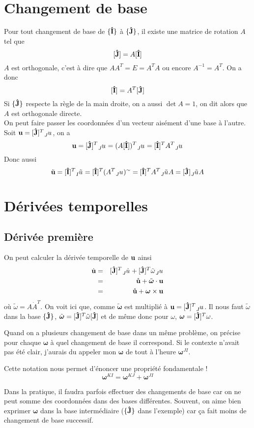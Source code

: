 \documentclass[11pt,a4paper]{article}
\newcommand\fv[1]{{\bf #1}} %
\newcommand\fvd[1]{\dot{\bf #1}} %
\newcommand\fvr[1]{\mathring{\bf #1}} %
\newcommand\ui{{\bf\hat{I}}} %
\newcommand\uj{{\bf\hat{J}}} %
\newcommand\wrt[2]{\ensuremath{\tensor*[_{ #1}]{ #2}{}}} %
\newcommand\omegaf{{\bm \omega}}
\newcommand\omegaft{\tilde{\bm \omega}}
\newcommand\omegat{\tilde{\omega}}
\begin{document}
\section{Changement de base}

Pour tout changement de base de $\{\ui\}$ à $\{\uj\}$, il existe une matrice de rotation $A$ tel que
\[ [\uj] = A [\ui] \]
$A$ est orthogonale, c'est à dire que $AA^T = E = A^TA$ ou encore $A^{-1} = A^T$.
On a donc
\[ [\ui] = A^T [\uj] \]
Si $\{\uj\}$ respecte la règle de la main droite, on a aussi $\det A = 1$, on dit alors que $A$ est orthogonale directe.\\
On peut faire passer les coordonnées d'un vecteur aisément d'une base à l'autre.
Soit $\fv{u} = [\uj]^T \wrt{J}{u}$, on a
\[ \fv{u} = [\uj]^T \wrt{J}{u} = (A[\ui])^T \wrt{J}{u} = [\ui]^TA^T \wrt{J}{u} \]
Donc aussi
\[ \tilde{\fv{u}} = [\ui]^T \wrt{I}{\tilde{u}} = [\ui]^T (A^T \wrt{J}{u})^{\sim} = [\ui]^T A^T \wrt{J}{\tilde{u}} A = [\uj] \wrt{J}{\tilde{u}} A \]

\section{Dérivées temporelles}

\subsection{Dérivée première}
On peut calculer la dérivée temporelle de $\fv{u}$ ainsi
\begin{eqnarray*}
	\fvd{u} &=& [\uj]^T \wrt{J}{\dot{u}} + [\uj]^T \omegat\wrt{J}{u}\\
	&=& \fvr{u} + \omegaft \cdot \fv{u}\\
	&=& \fvr{u} + \omegaf \times \fv{u}
\end{eqnarray*}
où $\omegat = A\dot{A}^T$.
On voit ici que, comme $\omegaft$ est multiplié à $\fv{u} = [\uj]^T \wrt{J}{u}$.
Il nous faut $\omegat$ dans la base $\{\uj\}$, $\omegaft = [\uj]^T \omegat [\uj]$ et de même donc pour $\omega$, $\omegaf = [\uj]^T \omega$.

Quand on a plusieurs changement de base dans un même problème, on précise pour chaque $\omegaf$ à quel changement de base il correspond.
Si le contexte n'avait pas été clair, j'aurais du appeler mon $\omegaf$ de tout à l'heure $\omegaf^{JI}$.

Cette notation nous permet d'énoncer une propriété fondamentale !
\[ \omegaf^{KI} = \omegaf^{KJ} + \omegaf^{JI} \]

Dans la pratique, il faudra parfois effectuer des changements de base car on ne peut somme des coordonnées dans des bases différentes.
Souvent, on aime bien exprimer $\omegaf$ dans la base intermédiaire ($\{\uj\}$ dans l'exemple) car ça fait moins de changement de base successif.
\end{document}
